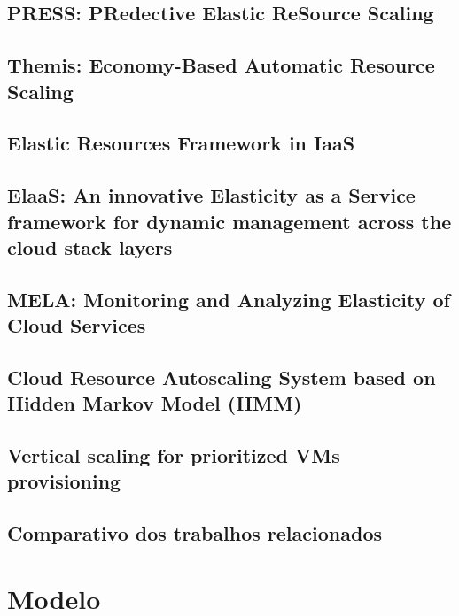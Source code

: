 \documentclass[twoside,english,brazilian]{UNISINOSmonografia}
\begin{document}
\section{PRESS: PRedective Elastic ReSource Scaling}

\section{Themis: Economy-Based Automatic Resource Scaling}

\section{Elastic Resources Framework in IaaS}

\section{ElaaS: An innovative Elasticity as a Service framework for dynamic management across the cloud stack layers}

\section{MELA: Monitoring and Analyzing Elasticity of Cloud Services}

\section{Cloud Resource Autoscaling System based on Hidden Markov Model (HMM)}

\section{Vertical scaling for prioritized VMs provisioning}

\section{Comparativo dos trabalhos relacionados}

\chapter{Modelo}
\end{document}

